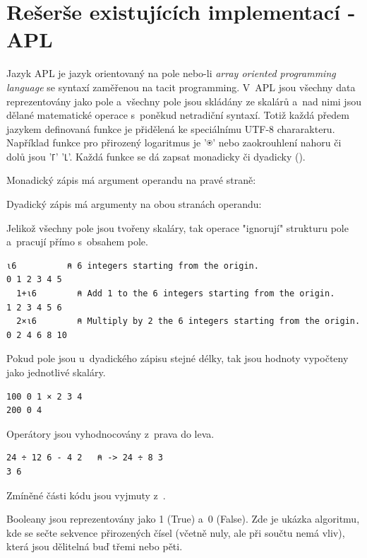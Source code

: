\documentclass[male, czech]{kithesis}
\newcommand{\aplInline}[1]{\colorbox{gray!10}{{\apl{#1}}}}
\begin{document}
\section{Rešerše existujících implementací - APL}

Jazyk APL je jazyk orientovaný na pole nebo-li \textit{array oriented programming language} se 
syntaxí zaměřenou na tacit programming. V~APL jsou všechny data reprezentovány jako pole 
a~všechny pole jsou skládány ze skalárů a~nad 
nimi jsou dělané matematické operace s~poněkud netradiční syntaxí. Totiž každá 
předem jazykem definovaná funkce je přidělená ke speciálnímu UTF-8 chararakteru. 
Například funkce pro přirozený logaritmus je {\apl '⍟'} nebo zaokrouhlení nahoru či dolů 
jsou {\apl '⌈' '⌊'}.
Každá funkce se dá zapsat monadicky či dyadicky (\cite{WhyAPLIsWorthKnowing}).

Monadický zápis má argument operandu na pravé straně:
\aplInline{-5    ⍝ monadic}

Dyadický zápis má argumenty na obou stranách operandu:
\aplInline{10-7  ⍝ dyadic}

Jelikož všechny pole jsou tvořeny skaláry, tak operace "ignorují" strukturu pole a~pracují přímo 
s~obsahem pole.

\begin{lstlisting}[language=apl,extendedchars=true]
  ⍳6          ⍝ 6 integers starting from the origin.
0 1 2 3 4 5
  1+⍳6        ⍝ Add 1 to the 6 integers starting from the origin.
1 2 3 4 5 6
  2×⍳6        ⍝ Multiply by 2 the 6 integers starting from the origin.
0 2 4 6 8 10
\end{lstlisting} 

Pokud pole jsou u~dyadického zápisu stejné délky, tak jsou hodnoty vypočteny jako jednotlivé 
skaláry.

\begin{lstlisting}[language=apl,extendedchars=true]
  100 0 1 × 2 3 4
200 0 4
\end{lstlisting}

Operátory jsou vyhodnocovány z~prava do leva.

\begin{lstlisting}[language=apl,extendedchars=true]
  24 ÷ 12 6 - 4 2   ⍝ -> 24 ÷ 8 3
3 6
\end{lstlisting}

Zmíněné části kódu jsou vyjmuty z~\cite{WhyAPLIsWorthKnowing}.

Booleany jsou reprezentovány jako 1 (True) a~0 (False). Zde je ukázka algoritmu, kde 
se sečte sekvence přirozených čísel (včetně nuly, ale při součtu nemá vliv), 
která jsou dělitelná buď třemi nebo pěti.
\end{document}
